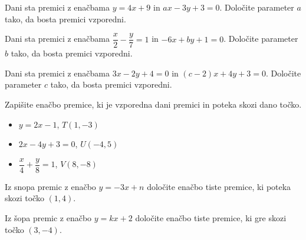         


        
            
            \begin{naloga}
                Dani sta premici z enačbama $y=4x+9$ in $ax-3y+3=0$. Določite parameter $a$ tako, da bosta premici vzporedni.
            \end{naloga}

            \begin{naloga}
                Dani sta premici z enačbama $\dfrac{x}{2}-\dfrac{y}{7}=1$ in $-6x+by+1=0$. Določite parameter $b$ tako, da bosta premici vzporedni.
            \end{naloga}

            \begin{naloga}
                Dani sta premici z enačbama $3x-2y+4=0$ in $(c-2)x+4y+3=0$. Določite parameter $c$ tako, da bosta premici vzporedni.
            \end{naloga}

        


        
            \begin{naloga}
                Zapišite enačbo premice, ki je vzporedna dani premici in poteka skozi dano točko.
                    \begin{itemize}
                        \item $y=2x-1$, $T(1,-3)$ 
                        \item $2x-4y+3=0$, $U(-4,5)$ 
                        \item $\dfrac{x}{4}+\dfrac{y}{8}=1$, $V(8,-8)$ 

                    \end{itemize}
            \end{naloga}


            \begin{naloga}
                Iz snopa premic z enačbo $y=-3x+n$ določite enačbo tiste premice, ki poteka skozi točko $(1,4)$.
            \end{naloga}

            \begin{naloga}
                Iz šopa premic z enačbo $y=kx+2$ določite enačbo tiste premice, ki gre skozi točko $(3,-4)$.
            \end{naloga}

        


